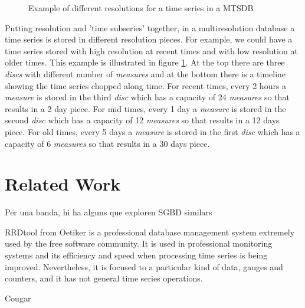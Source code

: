 \documentclass[
english
]{scrartcl}
\newcommand{\imatges}{../../imatges}
\begin{document}
\begin{figure}[tp]
\centering

\caption{Example of different resolutions for a time series in a MTSDB}
\label{fig:model:window}
\end{figure}


Putting resolution and 'time subseries' together, in a multiresolution database a time series is stored in different resolution pieces. For example, we could have a time series stored with high resolution at recent times and with low resolution at older times. This example is illustrated in figure \ref{fig:model:window}. At the top there are three \emph{discs} with different number of \emph{measures} and at the bottom there is a timeline showing the time series chopped along time. For recent times, every 2 hours a \emph{measure} is stored in the third \emph{disc} which has a capacity of 24 \emph{measures} so that results in a 2 day piece. For mid times, every 1 day a  \emph{measure} is stored in the second \emph{disc} which has a capacity of 12 \emph{measures} so that results in a 12 days piece. For old times, every 5 days a  \emph{measure} is stored in the first \emph{disc} which has a capacity of 6 \emph{measures} so that results in a 30 days piece. 


\section{Related Work}


Per una banda, hi ha alguns que exploren SGBD similars



RRDtool from Oetiker \cite{rrdtool} is a professional database
management system extremely used by the free software community. It is
used in professional monitoring systems and its efficiency and speed
when processing time series is being improved. Nevertheless, it is
focused to a particular kind of data, gauges and counters, and it has
not general time series operations.

Cougar 


\end{document}
